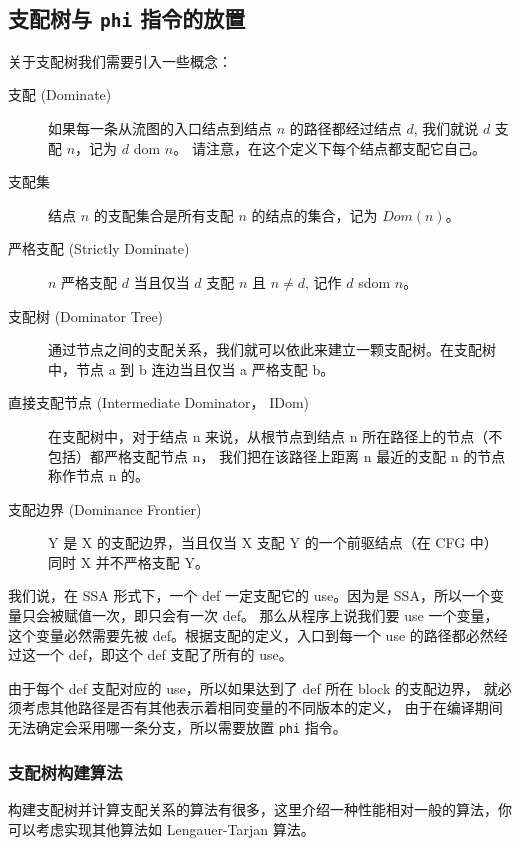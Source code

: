 \subsection{支配树与 \texttt{phi} 指令的放置}

关于支配树我们需要引入一些概念：

\begin{description}
    \item[支配 (Dominate)]
    如果每一条从流图的入口结点到结点 $n$ 的路径都经过结点 $d$, 我们就说 $d$ 支配 $n$，记为 $d$ dom $n$。
    请注意，在这个定义下每个结点都支配它自己。
    \item[支配集]
    结点 $n$ 的支配集合是所有支配 $n$ 的结点的集合，记为 $\mathit{Dom}(n)$。
    \item[严格支配 (Strictly Dominate)]
    $n$ 严格支配 $d$ 当且仅当 $d$ 支配 $n$ 且 $n\neq d$, 记作 $d$ sdom $n$。
       
    \item[支配树 (Dominator Tree)]
    通过节点之间的支配关系，我们就可以依此来建立一颗支配树。在支配树中，节点 a 到 b 连边当且仅当 a 严格支配 b。

    \item[直接支配节点 (Intermediate Dominator， IDom)]
    在支配树中，对于结点 n 来说，从根节点到结点 n 所在路径上的节点（不包括）都严格支配节点 n，
    我们把在该路径上距离 n 最近的支配 n 的节点称作节点 n 的。
    \item[支配边界 (Dominance Frontier)]
    Y 是 X 的支配边界，当且仅当 X 支配 Y 的一个前驱结点（在 CFG 中）
    同时 X 并不严格支配 Y。
\end{description}

我们说，在 SSA 形式下，一个 def 一定支配它的 use。因为是 SSA，所以一个变量只会被赋值一次，即只会有一次 def。
那么从程序上说我们要 use 一个变量，这个变量必然需要先被 def。根据支配的定义，入口到每一个
use 的路径都必然经过这一个 def，即这个 def 支配了所有的 use。

由于每个 def 支配对应的 use，所以如果达到了 def 所在 block 的支配边界，
就必须考虑其他路径是否有其他表示着相同变量的不同版本的定义，
由于在编译期间无法确定会采用哪一条分支，所以需要放置 \texttt{phi} 指令。

\subsubsection{支配树构建算法}

构建支配树并计算支配关系的算法有很多，这里介绍一种性能相对一般的算法，你可以考虑实现其他算法如 Lengauer-Tarjan
算法。

